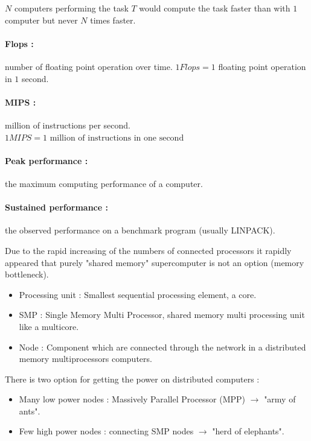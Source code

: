 \documentclass[11pt,a4paper]{report}
\begin{document}
$N$ computers performing the task $T$ would compute the task faster than with $1$ computer but never $N$ times faster.

\paragraph*{Flops :}  number of floating point operation over time. $1 Flops = 1$ floating point operation in $1$ second.

\paragraph*{ MIPS :} million of instructions per second. $1 MIPS = 1 \text{ million of instructions in one second}$

\paragraph*{Peak performance :} the maximum computing performance of a computer.

\paragraph*{Sustained performance :} the observed performance on a benchmark program (usually LINPACK).

Due to the rapid increasing of the numbers of connected processors it rapidly appeared that purely "shared memory" supercomputer is not an option (memory bottleneck).

\begin{itemize}
    \item Processing unit : Smallest sequential processing element, a core.
    \item SMP : Single Memory Multi Processor, shared memory multi processing unit like a multicore.
    \item Node : Component which are connected through the network in a distributed memory multiprocessors computers.
\end{itemize}

There is two option for getting the power on distributed computers :
\begin{itemize}
    \item Many low power nodes : Massively Parallel Processor (MPP) $\rightarrow$ "army of ants".
    \item Few high power nodes : connecting SMP nodes $\rightarrow$ "herd of elephants".
\end{itemize}
\end{document}
